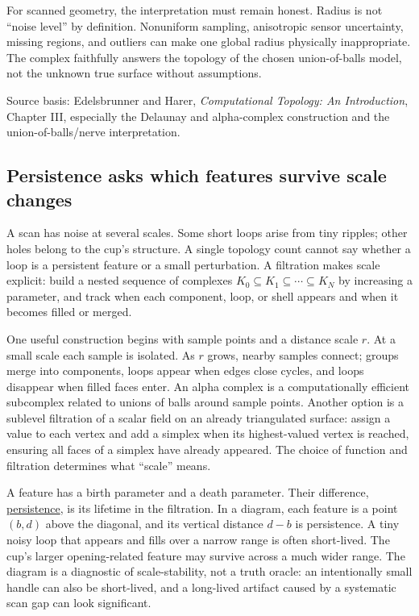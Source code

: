For scanned geometry, the interpretation must remain honest. Radius is not ``noise level'' by definition. Nonuniform sampling, anisotropic sensor uncertainty, missing regions, and outliers can make one global radius physically inappropriate. The complex faithfully answers the topology of the chosen union-of-balls model, not the unknown true surface without assumptions.

Source basis: Edelsbrunner and Harer, \emph{Computational Topology: An Introduction}, Chapter III, especially the Delaunay and alpha-complex construction and the union-of-balls/nerve interpretation.

\subsection{Persistence asks which features survive scale changes}\label{03-visual-computing-i-ch002-persistence-asks-which-features-survive-scale-changes}

\hypertarget{03-visual-computing-i-ch002-persistence-asks-which-features-survive-scale-changes}{}

A scan has noise at several scales. Some short loops arise from tiny ripples; other holes belong to the cup's structure. A single topology count cannot say whether a loop is a persistent feature or a small perturbation. A filtration makes scale explicit: build a nested sequence of complexes \(K_0\subseteq K_1\subseteq\cdots\subseteq K_N\) by increasing a parameter, and track when each component, loop, or shell appears and when it becomes filled or merged.

One useful construction begins with sample points and a distance scale \(r\). At a small scale each sample is isolated. As \(r\) grows, nearby samples connect; groups merge into components, loops appear when edges close cycles, and loops disappear when filled faces enter. An alpha complex is a computationally efficient subcomplex related to unions of balls around sample points. Another option is a sublevel filtration of a scalar field on an already triangulated surface: assign a value to each vertex and add a simplex when its highest-valued vertex is reached, ensuring all faces of a simplex have already appeared. The choice of function and filtration determines what ``scale'' means.

A feature has a birth parameter and a death parameter. Their difference, \hyperref[appendix-e4d8ed8d6787]{persistence}, is its lifetime in the filtration. In a diagram, each feature is a point \((b,d)\) above the diagonal, and its vertical distance \(d-b\) is persistence. A tiny noisy loop that appears and fills over a narrow range is often short-lived. The cup's larger opening-related feature may survive across a much wider range. The diagram is a diagnostic of scale-stability, not a truth oracle: an intentionally small handle can also be short-lived, and a long-lived artifact caused by a systematic scan gap can look significant.

